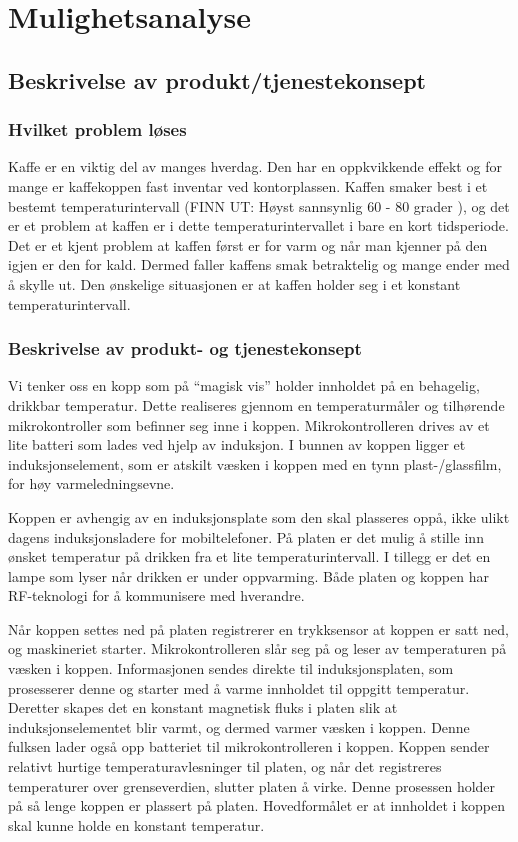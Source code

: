 \chapter{Mulighetsanalyse}
\section{Beskrivelse av produkt/tjenestekonsept}
\subsection{Hvilket problem løses}
Kaffe er en viktig del av manges hverdag. Den har en oppkvikkende effekt og for mange er kaffekoppen fast inventar ved kontorplassen. Kaffen smaker best i et bestemt temperaturintervall (FINN UT: Høyst sannsynlig 60 - 80 grader \cite{bestekaffe} ), og det er et problem at kaffen er i dette temperaturintervallet i bare en kort tidsperiode. Det er et kjent problem at kaffen først er for varm og når man kjenner på den igjen er den for kald. Dermed faller kaffens smak betraktelig og mange ender med å skylle ut. Den ønskelige situasjonen er at kaffen holder seg i et konstant temperaturintervall. 

\subsection{Beskrivelse av produkt- og tjenestekonsept}
Vi tenker oss en kopp som på “magisk vis” holder innholdet på en behagelig, drikkbar temperatur. Dette realiseres gjennom en temperaturmåler og tilhørende mikrokontroller som befinner seg inne i koppen. Mikrokontrolleren drives av et lite batteri som lades ved hjelp av induksjon. I bunnen av koppen ligger et induksjonselement, som er atskilt væsken i koppen med en tynn plast-/glassfilm, for høy varmeledningsevne.

Koppen er avhengig av en induksjonsplate som den skal plasseres oppå, ikke ulikt dagens induksjonsladere for mobiltelefoner. På platen er det mulig å stille inn ønsket temperatur på drikken fra et lite temperaturintervall. I tillegg er det en lampe som lyser når drikken er under oppvarming. Både platen og koppen har RF-teknologi for å kommunisere med hverandre.

Når koppen settes ned på platen registrerer en trykksensor at koppen er satt ned, og maskineriet starter. Mikrokontrolleren slår seg på og leser av temperaturen på væsken i koppen. Informasjonen sendes direkte til induksjonsplaten, som prosesserer denne og starter med å varme innholdet til oppgitt temperatur. Deretter skapes det en konstant magnetisk fluks i platen slik at induksjonselementet blir varmt, og dermed varmer væsken i koppen. Denne fulksen lader også opp batteriet til mikrokontrolleren i koppen. 
Koppen sender relativt hurtige temperaturavlesninger til platen, og når det registreres temperaturer over grenseverdien, slutter platen å virke. Denne prosessen holder på så lenge koppen er plassert på platen. Hovedformålet er at innholdet i koppen skal kunne holde en konstant temperatur.

